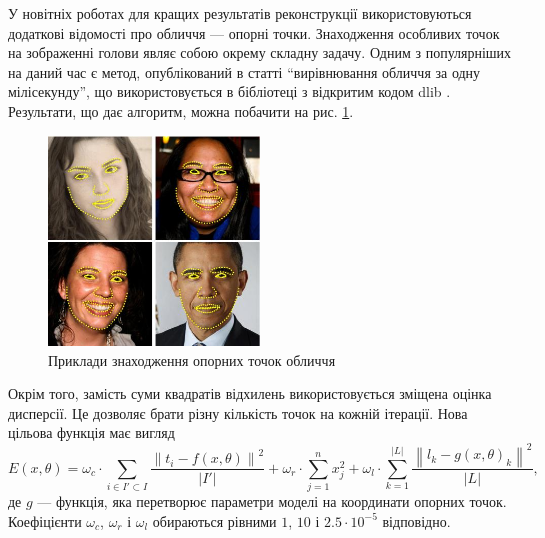 У новітніх роботах для кращих результатів реконструкції використовуються
додаткові відомості про обличчя --- опорні точки.
Знаходження особливих точок на зображенні голови
являє собою окрему складну задачу.
Одним з популярніших на даний час є метод, опублікований в статті
``вирівнювання обличчя за одну мілісекунду'',
що використовується в бібліотеці з відкритим кодом dlib \cite{Kazemi:2014}.
Результати, що дає алгоритм, можна побачити на рис. \ref{fig:problems:dlib}.
\begin{figure}[h]
  \centering
    \includegraphics[width=0.5\textwidth]{images/dlib}
  \caption{Приклади знаходження опорних точок обличчя}
  \label{fig:problems:dlib}
\end{figure}

Окрім того,
замість суми квадратів відхилень використовується зміщена оцінка дисперсії.
Це дозволяє брати різну кількість точок на кожній ітерації.
Нова цільова функція має вигляд
\begin{equation}\label{eq:energy:face2face}
  E\left( x, \theta \right)
  = \omega_c \cdot \sum_{i \in I' \subset I}
      \frac{\left\| t_i - f\left( x, \theta \right) \right\|^2}
           {\left| I' \right|}
  + \omega_r \cdot \sum_{j = 1}^{n} x_j^2
  + \omega_l \cdot \sum_{k = 1}^{\left| L \right|}
    \frac{\left\| l_k - g\left( x, \theta \right)_k \right\|^2}
         {\left| L \right|},
\end{equation}
де $g$ --- функція, яка перетворює параметри моделі на координати опорних точок.
Коефіцієнти $\omega_c$, $\omega_r$ і $\omega_l$
обираються рівними $1$, $10$ і $2.5 \cdot 10^{-5}$ відповідно.
